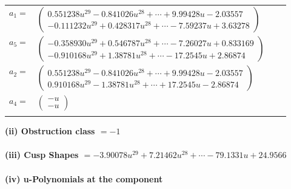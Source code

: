 \documentclass[1p]{elsarticle_modified}
\theoremstyle{definition}
\begin{document}
\begin{tabular}{m{7pt} m{180pt} m{7pt} m{180pt} }
\flushright $a_{1}=$&$\begin{pmatrix}0.551238 u^{29}-0.841026 u^{28}+\cdots+9.99428 u-2.03557\\-0.111232 u^{29}+0.428317 u^{28}+\cdots-7.59237 u+3.63278\end{pmatrix}$ \\
\flushright $a_{5}=$&$\begin{pmatrix}-0.358930 u^{29}+0.546787 u^{28}+\cdots-7.26027 u+0.833169\\-0.910168 u^{29}+1.38781 u^{28}+\cdots-17.2545 u+2.86874\end{pmatrix}$ \\
\flushright $a_{2}=$&$\begin{pmatrix}0.551238 u^{29}-0.841026 u^{28}+\cdots+9.99428 u-2.03557\\0.910168 u^{29}-1.38781 u^{28}+\cdots+17.2545 u-2.86874\end{pmatrix}$ \\
\flushright $a_{4}=$&$\begin{pmatrix}- u\\- u\end{pmatrix}$\\&\end{tabular}
\flushleft \textbf{(ii) Obstruction class $= -1$}\\~\\
\flushleft \textbf{(iii) Cusp Shapes $= -3.90078 u^{29}+7.21462 u^{28}+\cdots-79.1331 u+24.9566$}\\~\\
\newpage\renewcommand{\arraystretch}{1}
\flushleft \textbf{(iv) u-Polynomials at the component}\newline \\
\end{document}
